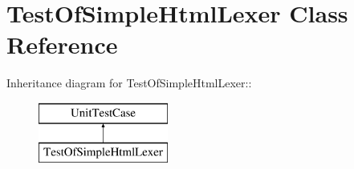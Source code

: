 \hypertarget{class_test_of_simple_html_lexer}{
\section{TestOfSimpleHtmlLexer Class Reference}
\label{class_test_of_simple_html_lexer}
}
Inheritance diagram for TestOfSimpleHtmlLexer::\begin{figure}[H]
\begin{center}
\leavevmode
\includegraphics[height=2cm]{class_test_of_simple_html_lexer}
\end{center}
\end{figure}
